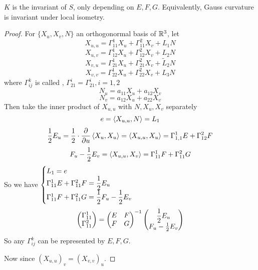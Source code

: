 \begin{theorem}\label{Gauss fantanstic theorem}
    $ K  $ is the invariant of  $ S $, only depending on  $ E,F,G $.  Equivalently, Gauss curvature is invariant under local isometry.
\end{theorem}
\begin{proof}
    For  $ \{X_u,X_v,N\} $ an orthogonormal basis of  $ \mathbb R^3 $, let 
    \[X_{u,u}=\Gamma^1_{11}X_u+\Gamma_{11}^2X_v+L_1N\]
    \[X_{u,v}=\Gamma_{12}^1X_u+\Gamma_{12}^2X_v+L_2N\]  
    \[X_{v,u}=\Gamma_{21}^1X_u+\Gamma_{21}^2X_v+\tilde{L}_2N\]
    \[X_{v,v}=\Gamma_{22}^1X_u+\Gamma_{22}^2X_v+L_3N\]
    where  $ \Gamma_{ij}^k $ is called ,  $ \Gamma_{21}^i=\Gamma_{21}^i,i=1,2 $ 
    \[N_u=a_{11}X_u+a_{12}X_v\]
    \[N_v=a_{12}X_u+a_{22}X_v\]
    Then take the inner product of  $ X_{u,u} $ with  $ N,X_u,X_v $ separately  
    \[e=\left<X_{u,u},N\right>=L_1\]
    \[\frac{1}{2}E_u=\frac{1}{2}\cdot\frac{\partial }{\partial u}\left<X_u,X_u\right>=\left<X_{u,u},X_u\right>=\Gamma_{1,1}^1E+\Gamma_{12}^2F\]
    \[F_u-\frac{1}{2}E_v=\left<X_{u,u},X_v\right>=\Gamma_{11}^1F+\Gamma_{11}^2G\]
    So we have  $ \begin{cases}
        L_1=e\\
        \Gamma_{11}^1E+\Gamma_{11}^2F=\displaystyle\frac{1}{2}E_u\\
        \Gamma_{11}^1F+\Gamma_{11}^2G=\displaystyle\frac{1}{2}F_u-\frac{1}{2}E_v
    \end{cases} $ \ie 
    \begin{equation}
        \begin{pmatrix}
            \Gamma_{11}^1\\
            \Gamma_{11}^2
        \end{pmatrix}=\begin{pmatrix}
            E&F\\
            F&G
        \end{pmatrix}^{-1}\begin{pmatrix}
            \displaystyle\frac{1}{2}E_u\\
            F_u-\frac{1}{2}E_v
        \end{pmatrix}
    \end{equation}
    So any  $ \Gamma_{ij}^k $ can be represented by  $ E,F,G $.
    
    Now since   $ (X_{u,u})_v=(X_{v,v})_u $.
    

\end{proof}
